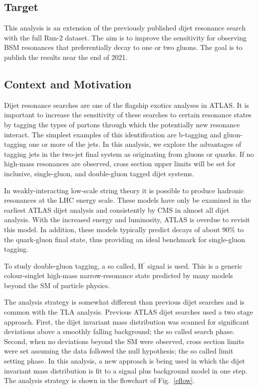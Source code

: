 \subsection{Target}

This analysis is an extension of the previously published dijet
resonance search with the full Run-2 dataset. 
The aim is to improve the sensitivity for observing BSM resonances
that preferentially decay to one or two gluons. 
The goal is to publish the results near the end of 2021.

\subsection{Context and Motivation}

Dijet resonance searches are one of the flagship exotics analyses in
ATLAS.
It is important to increase the sensitivity of these searches to
certain resonance states by tagging the types of partons through which
the potentially new resonance interact.
The simplest examples of this identification are b-tagging and
gluon-tagging one or more of the jets.
In this analysis, we explore the advantages of tagging jets in the
two-jet final system as originating from gluons or quarks.
If no high-mass resonances are observed, cross section upper limits
will be set for inclusive, single-gluon, and double-gluon tagged dijet
systems.

In weakly-interacting low-scale string theory it is possible to
produce hadronic resonances at the LHC energy scale.
These models have only be examined in the earliest ATLAS dijet analysis
and consistently by CMS in almost all dijet analysis.
With the increased energy and luminosity, ATLAS is overdue to revisit
this model.
In addition, these models typically predict decays of about 90\% to
the quark-gluon final state, thus providing an ideal benchmark for
single-gluon tagging.

To study double-gluon tagging, a so called, H$^\prime$ signal is
used.
This is a generic colour-singlet high-mass narrow-resonance state
predicted by many models beyond the SM of particle physics.

The analysis strategy is somewhat different than previous dijet searches
and is common with the TLA analysis.
Previous ATLAS dijet searches used a two stage approach.
First, the dijet invariant mass distribution was scanned for
significant deviations above a smoothly falling background; the so
called search phase.
Second, when no deviations beyond the SM were observed, cross section
limits were set assuming the data followed the null hypothesis; the so
called limit setting phase. 
In this analysis, a new approach is being used in which the dijet
invariant mass distribution is fit to a signal plus background model
in one step. 
The analysis strategy is shown in the flowchart of Fig.~\ref{eflow}.

